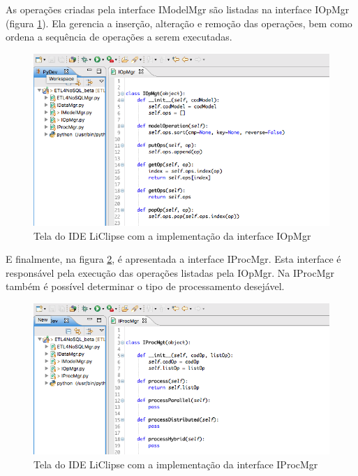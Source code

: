 As operações criadas pela interface IModelMgr são listadas na interface IOpMgr (figura \ref{iopmgr}). Ela gerencia a inserção, alteração e remoção das operações, bem como ordena a sequência de operações a serem executadas.

\begin{figure}[h!]
	\centering
	\includegraphics[scale=0.6]{fig/iopmgr.png}
	\caption{Tela do IDE LiClipse com a implementação da interface IOpMgr}
	\label{iopmgr}
\end{figure}

E finalmente, na figura \ref{iprocmgr}, é apresentada a interface IProcMgr. Esta interface é responsável pela execução das operações listadas pela IOpMgr. Na IProcMgr também é possível determinar o tipo de processamento desejável. 

\begin{figure}[h!]
	\centering
	\includegraphics[scale=0.6]{fig/iprocmgr.png}
	\caption{Tela do IDE LiClipse com a implementação da interface IProcMgr}
	\label{iprocmgr}
\end{figure}


